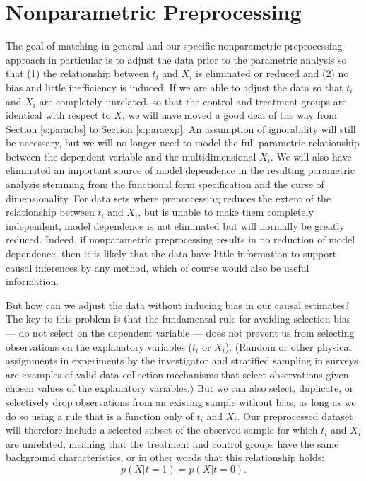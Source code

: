 \documentclass[11pt,titlepage]{article}
\begin{document}
\section{Nonparametric Preprocessing} \label{s:nonparpreproc}

The goal of matching in general and our specific nonparametric
preprocessing approach in particular is to adjust the data prior to
the parametric analysis so that (1) the relationship between $t_i$ and
$X_i$ is eliminated or reduced and (2) no bias and little inefficiency
is induced.  If we are able to adjust the data so that $t_i$ and $X_i$
are completely unrelated, so that the control and treatment groups are
identical with respect to $X$, we will have moved a good deal of the
way from Section \ref{s:paraobs} to Section \ref{s:paraexp}.  An
assumption of ignorability will still be necessary, but we will no
longer need to model the full parametric relationship between the
dependent variable and the multidimensional $X_i$.  We will also have
eliminated an important source of model dependence in the resulting
parametric analysis stemming from the functional form specification
and the curse of dimensionality.  For data sets where preprocessing
reduces the extent of the relationship between $t_i$ and $X_i$, but is
unable to make them completely independent, model dependence is not
eliminated but will normally be greatly reduced.  Indeed, if
nonparametric preprocessing results in no reduction of model
dependence, then it is likely that the data have little information to
support causal inferences by any method, which of course would also be
useful information.

But how can we adjust the data without inducing bias in our causal
estimates?  The key to this problem is that the fundamental rule for
avoiding selection bias --- do not select on the dependent variable
--- does not prevent us from selecting observations on the explanatory
variables ($t_i$ or $X_i$).  (Random or other physical assignments in
experiments by the investigator and stratified sampling in surveys are
examples of valid data collection mechanisms that select observations
given chosen values of the explanatory variables.)  But we can also
select, duplicate, or selectively drop observations from an existing
sample without bias, as long as we do so using a rule that is a
function only of $t_i$ and $X_i$.  Our preprocessed dataset will
therefore include a selected subset of the observed sample for which
$t_i$ and $X_i$ are unrelated, meaning that the treatment and control
groups have the same background characteristics, or in other words
that this relationship holds:
\begin{equation}
  \label{balance}
  p(X|t=1) = p(X|t=0).
\end{equation}
\end{document}
